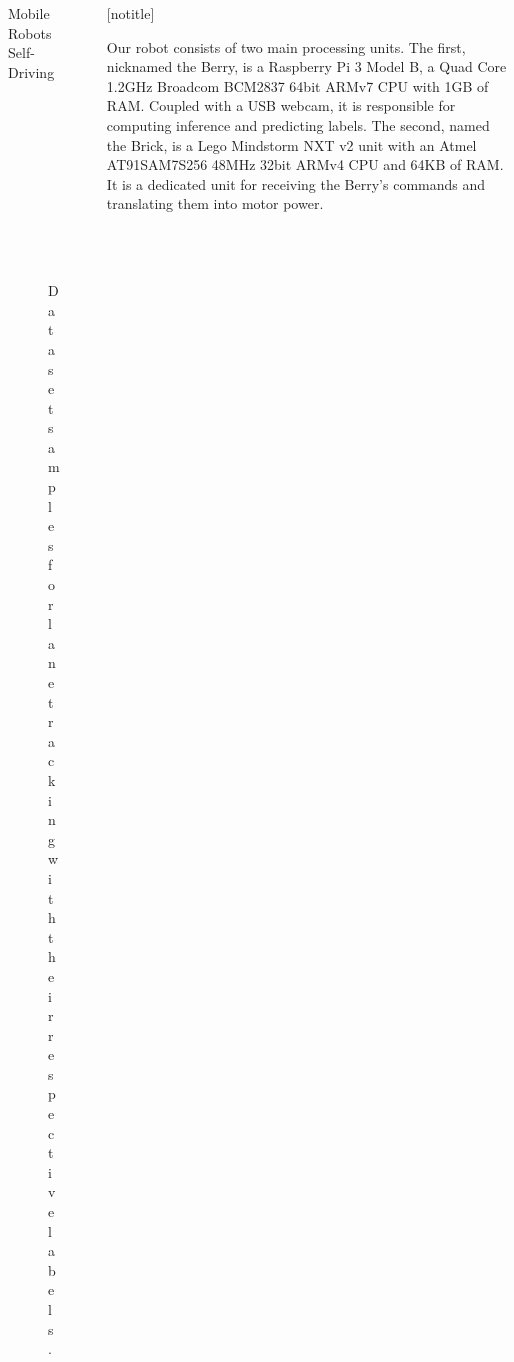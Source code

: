 \documentclass[final,hyperref={pdfpagelabels=false},notheorems]{beamer}
\newcommand{\shrink}{-15pt}
\theoremstyle{thesisstyle}
\begin{document}
\begin{frame}[t]
\begin{columns}[t]
\begin{column}{.5\textwidth}
\begin{block}{Mobile Robots Self-Driving}
\begin{figure}
\begin{subfigure}{0.3\linewidth}
          \captionsetup{justification=centering}
          \caption*{UP}
        \end{subfigure}
        \begin{subfigure}{0.3\linewidth}
          \centering\includegraphics[width=1.0\textwidth]{imgs/sample_right.png}
          \captionsetup{justification=centering}
          \caption*{RIGHT}
        \end{subfigure}
        \caption{Dataset samples for lane tracking with their respective labels.}
      \end{figure}
    \end{block}

  \end{column}


  \begin{column}{.018\textwidth}\end{column} %

  \begin{column}{.5\textwidth}

    \vspace{\shrink}
    [notitle]
    \begin{block}{}
      Our robot consists of two main processing units. The first, nicknamed the Berry, is a
      Raspberry Pi 3 Model B, a Quad Core 1.2GHz Broadcom BCM2837 64bit ARMv7 CPU with 1GB of RAM.
      Coupled with a USB webcam, it is responsible for computing inference and predicting labels.
      The second, named the Brick, is a Lego Mindstorm NXT v2 unit with an Atmel AT91SAM7S256 48MHz
      32bit ARMv4 CPU and 64KB of RAM. It is a dedicated unit for receiving the Berry's commands and
      translating them into motor power.


\end{block}
\end{column}
\end{columns}
\end{frame}
\end{document}
